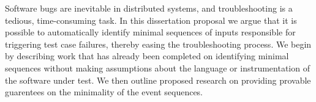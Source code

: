 Software bugs are inevitable in distributed systems,
and troubleshooting is a tedious, time-consuming task.
In this dissertation proposal we argue that it is possible to
automatically identify minimal sequences of inputs
responsible for triggering
test case failures, thereby easing the troubleshooting process.
We begin by describing work that has already been completed on
identifying minimal sequences without making assumptions about the
language or instrumentation of the software under test.
We then outline proposed research on providing provable guarentees on
the minimality of the event sequences.
